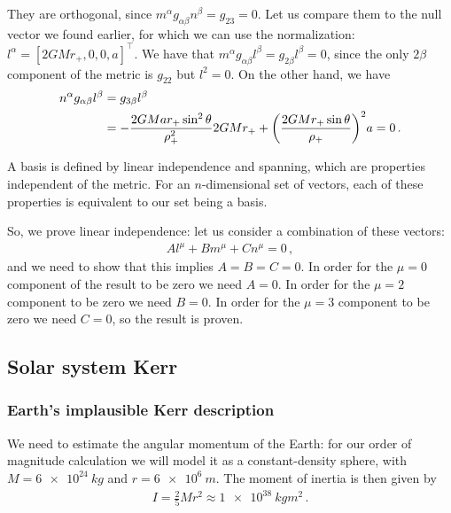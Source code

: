 \documentclass[main.tex]{subfiles}
\begin{document}
They are orthogonal, since \(m^{\alpha } g_{\alpha \beta } n^{\beta } = g_{23} =0 \). 
Let us compare them to the null vector we found earlier, for which we can use the normalization: \(l^{\alpha } = [2GMr_{+}, 0, 0, a]^{\top}\). 
We have that \(m^{\alpha } g_{\alpha \beta } l^{\beta } = g_{2 \beta } l^{\beta }=  0\), since the only \(2 \beta \) component of the metric is \(g_{22 }\) but \(l^{2}=0\). On the other hand, we have 
%
\begin{subequations}
\begin{align}
  n^{\alpha }g_{\alpha \beta } l^{\beta } 
  &= g_{3 \beta } l^{\beta } \\
  &= -\frac{ 2GMar_{+}\sin^2\theta }{\rho_{+}^2} 2GMr_{+}
  + \qty(\frac{2GMr_{+} \sin \theta }{\rho_{+}})^2 a = 0
\,.
\end{align}
\end{subequations}

A basis is defined by linear independence and spanning, which are properties independent of the metric. For an \(n\)-dimensional set of vectors, each of these properties is equivalent to our set being a basis.

So, we prove linear independence: let us consider a combination of these vectors: 
%
\begin{align}
  A l^{\mu } + B m^{\mu } + C n^{\mu } = 0
\,,
\end{align}
%
and we need to show that this implies \(A = B = C = 0\). 
In order for the \(\mu = 0\) component of the result to be zero we need \(A = 0\). In order for the \(\mu =2\) component to be zero we need \(B = 0\). In order for the \(\mu = 3\) component to be zero we need \(C = 0\), so the result is proven. 

\subsection{Solar system Kerr}

\subsubsection{Earth's implausible Kerr description}

We need to estimate the angular momentum of the Earth: for our order of magnitude calculation we will model it as a constant-density sphere, with \(M = \SI{6e+24}{kg}\) and \(r = \SI{6e6}{m}\). The moment of inertia is then given by 
%
\begin{align}
  I = \frac{2}{5} M r^{2} \approx \SI{1e38}{kg m^2}
\,.
\end{align}
\end{document}
